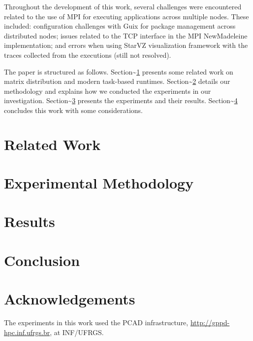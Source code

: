 \documentclass[conference, 10pt, final]{IEEEtran}
\begin{document}
Throughout the development of this work, several challenges were encountered related to the use of MPI for executing applications across multiple nodes. These included: configuration challenges with Guix for package management across distributed nodes; issues related to the TCP interface in the MPI NewMadeleine implementation; and errors when using StarVZ \cite{pinto2021providing} visualization framework with the traces collected from the executions (still not resolved).

The paper is structured as follows. Section\textasciitilde{}\ref{sec:related} presents some related work on matrix distribution and modern task-based runtimes. Section\textasciitilde{}\ref{sec:methodology} details our methodology and explains how we conducted the experiments in our investigation. Section\textasciitilde{}\ref{sec:results} presents the experiments and their results. Section\textasciitilde{}\ref{sec:conclusion} concludes this work with some considerations.
\section{Related Work}
\label{sec:related}
\section{Experimental Methodology}
\label{sec:methodology}
\section{Results}
\label{sec:results}
\section{Conclusion}
\label{sec:conclusion}
\section*{Acknowledgements}

The experiments in this work used the PCAD infrastructure, \url{http://gppd-hpc.inf.ufrgs.br}, at INF/UFRGS.
\clearpage



\end{document}
